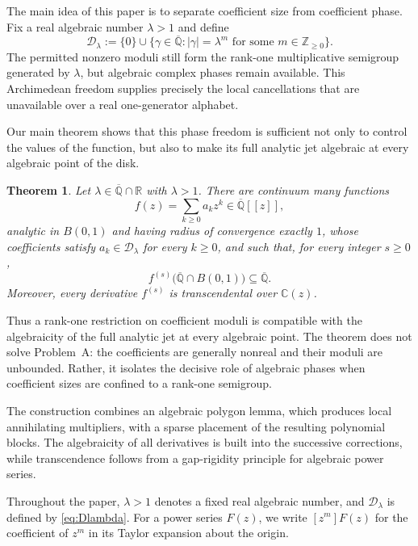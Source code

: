 \documentclass[10pt]{amsart}
\newtheorem{theorem}{Theorem}[section]
\theoremstyle{definition}
\theoremstyle{remark}
\numberwithin{equation}{section}
\newcommand{\Z}{\mathbb Z}
\newcommand{\R}{\mathbb R}
\newcommand{\C}{\mathbb C}
\newcommand{\Qbar}{\overline{\mathbb Q}}
\newcommand{\D}{\mathcal D}
\newcommand{\abs}[1]{\lvert #1\rvert}
\newcommand{\B}{B(0,1)}
\begin{document}
The main idea of this paper is to separate coefficient size from coefficient
phase. Fix a real algebraic number $\lambda>1$ and define
\begin{equation}\label{eq:Dlambda}
        \D_\lambda
        :=\{0\}\cup
        \bigl\{\gamma\in\Qbar:\abs{\gamma}=\lambda^m
        \text{ for some }m\in\Z_{\geq0}\bigr\}.
\end{equation}
The permitted nonzero moduli still form the rank-one multiplicative
semigroup generated by $\lambda$, but algebraic complex phases remain
available. This Archimedean freedom supplies precisely the local
cancellations that are unavailable over a real one-generator alphabet.

Our main theorem shows that this phase freedom is sufficient not only to
control the values of the function, but also to make its full analytic jet
algebraic at every algebraic point of the disk.

\begin{theorem}\label{theorem:main}
Let $\lambda\in\Qbar\cap\R$ with $\lambda>1$. There are continuum many functions
\[
        f(z)=\sum_{k\geq0}a_kz^k\in\Qbar[[z]],
\]
analytic in $\B$ and having radius of convergence exactly $1$, whose
coefficients satisfy $a_k\in\D_\lambda$ for every $k\geq0$, and such that,
for every integer $s\geq0$,
\[
        f^{(s)}\bigl(\Qbar\cap\B\bigr)\subseteq\Qbar.
\]
Moreover, every derivative $f^{(s)}$ is transcendental over $\C(z)$.
\end{theorem}

Thus a rank-one restriction on coefficient moduli is compatible with the
algebraicity of the full analytic jet at every algebraic point. The theorem
does not solve Problem~A: the coefficients are generally nonreal and their
moduli are unbounded. Rather, it isolates the decisive role of algebraic
phases when coefficient sizes are confined to a rank-one semigroup.

The construction combines an algebraic polygon lemma, which produces local
annihilating multipliers, with a sparse placement of the resulting
polynomial blocks. The algebraicity of all derivatives is built into the
successive corrections, while transcendence follows from a gap-rigidity
principle for algebraic power series.

Throughout the paper, $\lambda>1$ denotes a fixed real algebraic number, and
$\D_\lambda$ is defined by \eqref{eq:Dlambda}. For a power series $F(z)$, we
write $[z^m]F(z)$ for the coefficient of $z^m$ in its Taylor expansion about
the origin.
\end{document}
